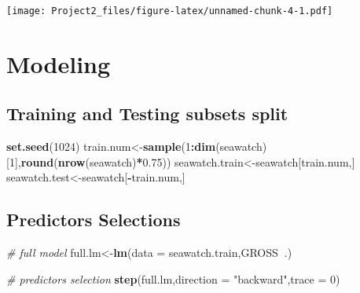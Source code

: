 \documentclass[]{article}
\newenvironment{Shaded}{\begin{snugshade}}{\end{snugshade}}
\newcommand{\KeywordTok}[1]{\textcolor[rgb]{0.13,0.29,0.53}{\textbf{#1}}}
\newcommand{\DataTypeTok}[1]{\textcolor[rgb]{0.13,0.29,0.53}{#1}}
\newcommand{\DecValTok}[1]{\textcolor[rgb]{0.00,0.00,0.81}{#1}}
\newcommand{\FloatTok}[1]{\textcolor[rgb]{0.00,0.00,0.81}{#1}}
\newcommand{\StringTok}[1]{\textcolor[rgb]{0.31,0.60,0.02}{#1}}
\newcommand{\CommentTok}[1]{\textcolor[rgb]{0.56,0.35,0.01}{\textit{#1}}}
\newcommand{\OperatorTok}[1]{\textcolor[rgb]{0.81,0.36,0.00}{\textbf{#1}}}
\newcommand{\NormalTok}[1]{#1}
\begin{document}
\texttt{[image: Project2\_files/figure-latex/unnamed-chunk-4-1.pdf]}

\begin{Shaded}
\end{Shaded}

\section{Modeling}\label{modeling}

\subsection{Training and Testing subsets
split}\label{training-and-testing-subsets-split}

\begin{Shaded}
\begin{Highlighting}[]
\KeywordTok{set.seed}\NormalTok{(}\DecValTok{1024}\NormalTok{)}
\NormalTok{train.num<-}\KeywordTok{sample}\NormalTok{(}\DecValTok{1}\OperatorTok{:}\KeywordTok{dim}\NormalTok{(seawatch)[}\DecValTok{1}\NormalTok{],}\KeywordTok{round}\NormalTok{(}\KeywordTok{nrow}\NormalTok{(seawatch)}\OperatorTok{*}\FloatTok{0.75}\NormalTok{))}
\NormalTok{seawatch.train<-seawatch[train.num,]}
\NormalTok{seawatch.test<-seawatch[}\OperatorTok{-}\NormalTok{train.num,]}
\end{Highlighting}
\end{Shaded}

\subsection{Predictors Selections}\label{predictors-selections}

\begin{Shaded}
\begin{Highlighting}[]
\CommentTok{# full model}
\NormalTok{full.lm<-}\KeywordTok{lm}\NormalTok{(}\DataTypeTok{data =}\NormalTok{ seawatch.train,GROSS}\OperatorTok{~}\NormalTok{.)}

\CommentTok{# predictors selection}
\KeywordTok{step}\NormalTok{(full.lm,}\DataTypeTok{direction =} \StringTok{"backward"}\NormalTok{,}\DataTypeTok{trace =} \DecValTok{0}\NormalTok{)}
\end{Highlighting}
\end{Shaded}
\end{document}
